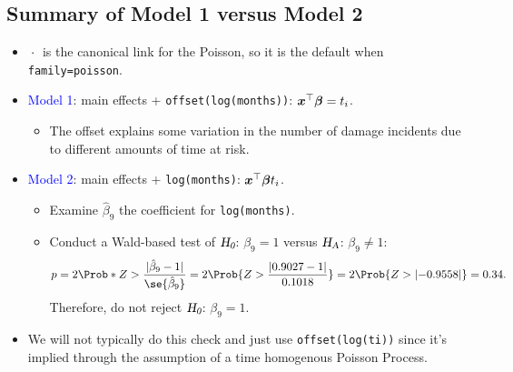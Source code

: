 \documentclass{article}\usepackage[]{graphicx}\usepackage[svgnames]{xcolor}
\let\log\relax%
\newcommand{\HN}{\textsl{H}_{\textsl{0}}}%
\newcommand{\HA}{\textsl{H}_{\textsl{A}}}%
\DeclarePairedDelimiter\abs{\lvert}{\rvert}
\providecommand{\Vector}[1]{\bm{#1}}%
\begin{document}
\subsection*{Summary of Model 1 versus Model 2}
\begin{itemize}
    \item $ \log{\:\cdot\:} $ is the canonical link for the Poisson, so it is the default when \texttt{family=poisson}.
    \item \textcolor{Blue}{Model 1}: main effects + \texttt{offset(log(months))}: $ \Vector{x}^\top \Vector{\beta}=\log{t_i} $.
          \begin{itemize}
              \item The offset explains some variation in the number of damage incidents due to
                    different amounts of time at risk.
          \end{itemize}
    \item \textcolor{Blue}{Model 2}: main effects + \texttt{log(months)}: $ \Vector{x}^\top \Vector{\beta}\log{t_i} $.
          \begin{itemize}
              \item Examine $ \hat{\beta}_9 $ the coefficient for \texttt{log(months)}.
              \item Conduct a Wald-based test of $ \HN $: $ \beta_9=1 $ versus $ \HA $: $ \beta_9\ne 1 $:
                    \[ p=2\Prob*{Z>\frac{\abs{\hat{\beta}_9-1}}{\se{\hat{\beta}_9}}}=2\Prob{Z>\frac{\abs{0.9027-1}}{0.1018}}=2\Prob{Z>\abs{-0.9558}}=0.34. \]
                    Therefore, do not reject $ \HN $: $ \beta_9=1 $.
          \end{itemize}
    \item We will not typically do this check and just use \texttt{offset(log(ti))} since it's implied
          through the assumption of a time homogenous Poisson Process.
\end{itemize}
\end{document}

